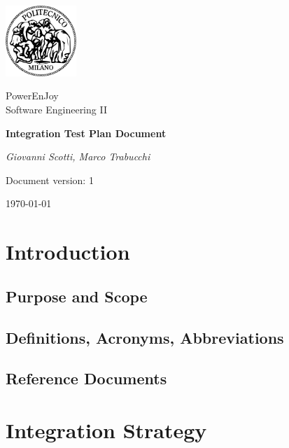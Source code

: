 \documentclass[a4paper,12pt]{report}
\begin{document}
\begin{titlepage}
\centering
\includegraphics[width=0.20\textwidth]{./pictures/logo_poli}\par
	\vspace{1.5cm}
	{\Large {PowerEnJoy \\ 
		Software Engineering II} \par}
	\vspace{1.5cm}
	{\LARGE \textbf{Integration Test Plan Document} \par}
	\vspace{1.5cm}
	{\Large\itshape Giovanni Scotti, Marco Trabucchi\par}
	\vspace{2cm}
	\vfill
	{\large Document version: 1\par}
	{\large \today \par}
\end{titlepage}

\tableofcontents

\chapter{Introduction}
\label{ch:Introduction}

\section{Purpose and Scope}


\section{Definitions, Acronyms, Abbreviations}


\section{Reference Documents}


\chapter{Integration Strategy}
\end{document}
